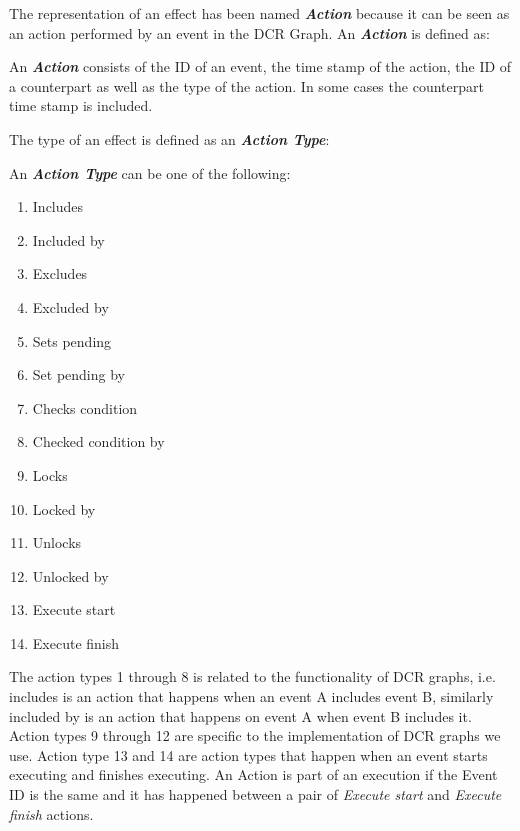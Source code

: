 	\newpar The representation of an effect has been named \textit{\textbf{Action}} because it can be seen as an action performed by an event in the DCR Graph. An \textit{\textbf{Action}} is defined as:
	
	\begin{definition}
		An \textit{\textbf{Action}} consists of the ID of an event, the time stamp of the action, the ID of a counterpart as well as  the type of the action. In some cases the counterpart time stamp is included.
	\end{definition}
	
	\newpar	The type of an effect is defined as an \textit{\textbf{Action Type}}:
	
	\begin{definition}
		An \textit{\textbf{Action Type}} can be one of the following:
		\begin{multicols}{3}
			\begin{enumerate}
				\item Includes
				\item Included by
				\item Excludes
				\item Excluded by
				\item Sets pending
				\item Set pending by
				\item Checks condition
				\item Checked condition by
				\item Locks
				\item Locked by
				\item Unlocks
				\item Unlocked by
				\item Execute start
				\item Execute finish
			\end{enumerate}
		\end{multicols}
	\end{definition}
	
	\newpar The action types 1 through 8 is related to the functionality of DCR graphs, i.e. includes is an action that happens when an event A includes event B, similarly included by is an action that happens on event A when event B includes it. Action types 9 through 12 are specific to the implementation of DCR graphs we use. Action type 13 and 14 are action types that happen when an event starts executing and finishes executing. An Action is part of an execution if the Event ID is the same and it has happened between a pair of \textit{Execute start} and \textit{Execute finish} actions.
	
